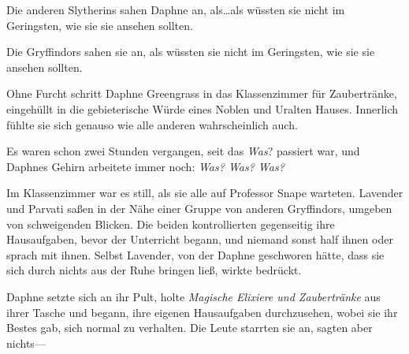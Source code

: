 
Die anderen Slytherins sahen Daphne an, als…als wüssten sie nicht im Geringsten, wie sie sie ansehen sollten.

Die Gryffindors sahen sie an, als wüssten sie nicht im Geringsten, wie sie sie ansehen sollten.

Ohne Furcht schritt Daphne Greengrass in das Klassenzimmer für Zaubertränke, eingehüllt in die gebieterische Würde eines Noblen und Uralten Hauses. Innerlich fühlte sie sich genauso wie alle anderen wahrscheinlich auch.

Es waren schon zwei Stunden vergangen, seit das \emph{Was}? passiert war, und Daphnes Gehirn arbeitete immer noch: \emph{Was? Was? Was?}

Im Klassenzimmer war es still, als sie alle auf Professor Snape warteten. Lavender und Parvati saßen in der Nähe einer Gruppe von anderen Gryffindors, umgeben von schweigenden Blicken. Die beiden kontrollierten gegenseitig ihre Hausaufgaben, bevor der Unterricht begann, und niemand sonst half ihnen oder sprach mit ihnen. Selbst Lavender, von der Daphne geschworen hätte, dass sie sich durch nichts aus der Ruhe bringen ließ, wirkte bedrückt.

Daphne setzte sich an ihr Pult, holte \emph{Magische Elixiere und Zaubertränke} aus ihrer Tasche und begann, ihre eigenen Hausaufgaben durchzusehen, wobei sie ihr Bestes gab, sich normal zu verhalten. Die Leute starrten sie an, sagten aber nichts—

